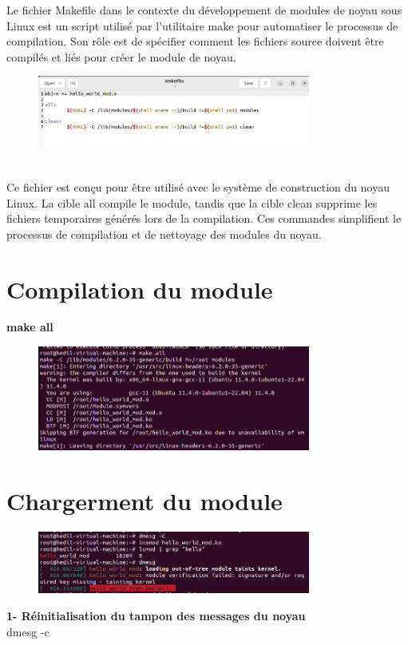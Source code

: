 Le fichier Makefile dans le contexte du développement de modules de noyau sous Linux est un script utilisé par l'utilitaire make pour automatiser le processus de compilation. Son rôle est de spécifier comment les fichiers source doivent être compilés et liés pour créer le module de noyau.
\begin{figure}[h]
    \includegraphics[width=0.8\textwidth]{images/48.png}   
\end{figure}
\\Ce fichier est conçu pour être utilisé avec le système de construction du noyau Linux. La cible all compile le module, tandis que la cible clean supprime les fichiers temporaires générés lors de la compilation. Ces commandes simplifient le processus de compilation et de nettoyage des modules du noyau.
\section{Compilation du module}
\textbf{make all}
\begin{figure}[h]
    \includegraphics[width=0.8\textwidth]{images/49.png}   
\end{figure}

\section{Chargerment du module}
\begin{figure}[h]
    \includegraphics[width=0.8\textwidth]{images/50.png}   
\end{figure}
\newpage
\textbf{1- Réinitialisation du tampon des messages du noyau}
\\dmesg -c

